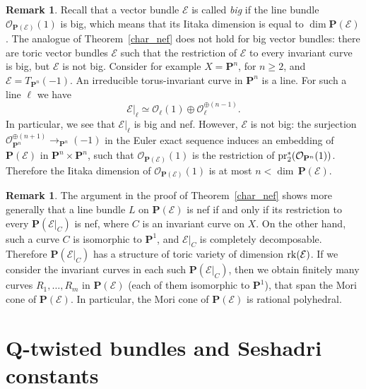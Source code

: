 \documentclass[12pt]{amsart}
\theoremstyle{definition}
\newtheorem{remark}[lemma]{Remark}
\theoremstyle{remark}
\begin{document}
\begin{remark}\label{rem3}
Recall that a vector bundle ${\mathcal{E}}$ is called \emph{big} if the line
bundle ${\mathcal{O}}_{{{\mathbf P}}({\mathcal{E}})}(1)$ is big, which means that its Iitaka
dimension is equal to $\dim {{\mathbf P}}({\mathcal{E}})$.  The analogue of
Theorem~\ref{char_nef} does not hold for big vector bundles: there
are toric vector bundles ${\mathcal{E}}$ such that the restriction of ${\mathcal{E}}$ to
every invariant curve is big, but ${\mathcal{E}}$ is not big.  Consider for
example $X={{\mathbf P}}^n$, for $n\geq 2$, and ${\mathcal{E}}=T_{{{\mathbf P}}^n}(-1)$.  An irreducible
torus-invariant curve in ${{\mathbf P}}^n$ is a line. For such a line $\ell$
we have
$${\mathcal{E}}\vert_{\ell}\simeq{\mathcal{O}}_{\ell}(1)\oplus{\mathcal{O}}_{\ell}^{\oplus (n-1)}.$$
In particular, we see that ${\mathcal{E}}\vert_{\ell}$ is big and nef.
However, ${\mathcal{E}}$ is not big: the surjection ${\mathcal{O}}_{{{\mathbf P}}^n}^{\oplus (n+1)}{\xrightarrow{\ \ }}_{{{\mathbf P}}^n}(-1)$
in the Euler exact sequence induces an 
embedding of  ${{\mathbf P}}({\mathcal{E}})$ in ${{\mathbf P}}^n\times
{{\mathbf P}}^n$, such that ${\mathcal{O}}_{{{\mathbf P}}({\mathcal{E}})}(1)$ is the restriction of ${\rm
pr}_2^*({\mathcal{O}}_{{{\mathbf P}}^n}(1))$. Therefore the Iitaka dimension of
${\mathcal{O}}_{{{\mathbf P}}({\mathcal{E}})}(1)$ is at most $n<\dim\,{{\mathbf P}}({\mathcal{E}})$.
\end{remark}

\begin{remark}\label{rem_nef_cone}
The argument in the proof of Theorem~\ref{char_nef} shows more
generally that a line bundle $L$ on ${{\mathbf P}}({\mathcal{E}})$ is nef if and only if
its restriction to every ${{\mathbf P}}({\mathcal{E}}\vert_C)$ is nef, where $C$ is an
invariant curve on $X$. On the other hand, such a curve $C$ is
isomorphic to ${{\mathbf P}}^1$, and ${\mathcal{E}}\vert_C$ is completely decomposable.
Therefore ${{\mathbf P}}({\mathcal{E}}\vert_C)$ has a structure of toric variety of
dimension ${\rm rk}({\mathcal{E}})$. If we consider the invariant curves in
each such ${{\mathbf P}}({\mathcal{E}}\vert_C)$, then we obtain finitely many curves
$R_1,\ldots,R_m$ in ${{\mathbf P}}({\mathcal{E}})$ (each of them isomorphic to ${{\mathbf P}}^1$),
that span the Mori cone of ${{\mathbf P}}({\mathcal{E}})$. In particular, the
Mori cone of ${{\mathbf P}}({\mathcal{E}})$ is rational polyhedral.
\end{remark}

\section{${{\mathbf Q}}$-twisted bundles and Seshadri constants} \label{Qsection}
\end{document}
